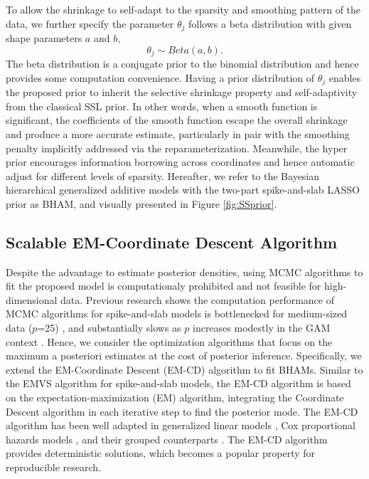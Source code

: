 \documentclass[AMA,STIX1COL,]{WileyNJD-v2}
\begin{document}
To allow the shrinkage to self-adapt to the sparsity and smoothing
pattern of the data, we further specify the parameter \(\theta_j\)
follows a beta distribution with given shape parameters \(a\) and \(b\),
\[
\theta_j \sim Beta(a, b).
\] The beta distribution is a conjugate prior to the binomial
distribution and hence provides some computation convenience. Having a
prior distribution of \(\theta_j\) enables the proposed prior to inherit
the selective shrinkage property and self-adaptivity
\cite{Bai2021Review} from the classical SSL prior. In other words, when
a smooth function is significant, the coefficients of the smooth
function escape the overall shrinkage and produce a more accurate
estimate, particularly in pair with the smoothing penalty implicitly
addressed via the reparameterization. Meanwhile, the hyper prior
encourages information borrowing across coordinates and hence automatic
adjust for different levels of sparsity. Hereafter, we refer to the
Bayesian hierarchical generalized additive models with the two-part
spike-and-slab LASSO prior as BHAM, and visually presented in Figure
\ref{fig:SSprior}.

\subsection{Scalable EM-Coordinate Descent Algorithm}

Despite the advantage to estimate posterior densities, using MCMC
algorithms to fit the proposed model is computationaly prohibited and
not feasible for high-dimensional data. Previous research shows the
computation performance of MCMC algorithms for spike-and-slab models is
bottlenecked for medium-sized data (\(p\)=25) \cite{George1997}, and
substantially slows as \(p\) increases modestly in the GAM context
\cite{Scheipl2013}. Hence, we consider the optimization algorithms that
focus on the maximum a posteriori estimates at the cost of posterior
inference. Specifically, we extend the EM-Coordinate Descent (EM-CD)
algorithm to fit BHAMs. Similar to the EMVS algorithm
\cite{Rockova2014a} for spike-and-slab models, the EM-CD algorithm is
based on the expectation-maximization (EM) algorithm, integrating the
Coordinate Descent algorithm in each iterative step to find the
posterior mode. The EM-CD algorithm has been well adapted in generalized
linear models \cite{Tang2017a}, Cox proportional hazards models
\cite{Tang2017}, and their grouped counterparts
\cite{Tang2018, Tang2019}. The EM-CD algorithm provides deterministic
solutions, which becomes a popular property for reproducible research.
\end{document}
